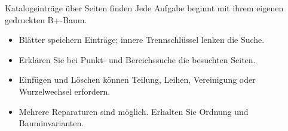 \begin{frame}[t]{Katalogeinträge über Seiten finden}
Jede Aufgabe beginnt mit ihrem eigenen gedruckten B+-Baum.
\medskip
\begin{itemize}
\item Blätter speichern Einträge; innere Trennschlüssel lenken die Suche.
\item Erklären Sie bei Punkt- und Bereichssuche die besuchten Seiten.
\item Einfügen und Löschen können Teilung, Leihen, Vereinigung oder Wurzelwechsel erfordern.
\item Mehrere Reparaturen sind möglich. Erhalten Sie Ordnung und Bauminvarianten.
\end{itemize}
\end{frame}
